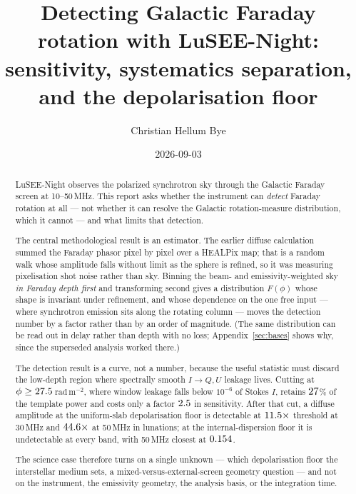 \documentclass[11pt]{article}
\title{Detecting Galactic Faraday rotation with LuSEE-Night:\\
  sensitivity, systematics separation, and the depolarisation floor}
\author{Christian Hellum Bye}
\date{2026-09-03}
\newcommand{\rmu}{\ensuremath{\mathrm{rad\,m^{-2}}}}
\begin{document}
\maketitle

\begin{abstract}
\noindent
LuSEE-Night observes the polarized synchrotron sky through the Galactic
Faraday screen at 10--50\,MHz. This report asks whether the instrument
can \emph{detect} Faraday rotation at all --- not whether it can
resolve the Galactic rotation-measure distribution, which it cannot ---
and what limits that detection.

The central methodological result is an estimator. The earlier diffuse
calculation summed the Faraday phasor pixel by pixel over a HEALPix
map; that is a random walk whose amplitude falls without limit as the
sphere is refined, so it was measuring pixelisation shot noise
rather than sky. Binning the beam- and emissivity-weighted sky
\emph{in Faraday depth first} and transforming second gives a
distribution $F(\phi)$ whose shape is invariant under refinement, and
whose dependence on the one free input --- where synchrotron emission
sits along the rotating column --- moves the detection number by a
factor \kscanAmpThirty{} rather than by an order of magnitude. (The same
distribution can be read out in delay rather than depth with no loss;
Appendix~\ref{sec:bases} shows why, since the superseded analysis
worked there.)

The detection result is a curve, not a number, because the useful
statistic must discard the low-depth region where spectrally smooth
$I\!\to\!Q,U$ leakage lives. Cutting at $\phi \ge 27.5$\,\rmu, where
window leakage falls below $10^{-6}$ of Stokes $I$, retains
$27$\% of the template power and costs only a factor
$2.5$ in sensitivity. After that cut, a diffuse amplitude at
the uniform-slab depolarisation floor is detectable at
$11.5\times$ threshold at 30\,MHz and
$44.6\times$ at 50\,MHz in \Lunations{} lunations; at the
internal-dispersion floor it is undetectable at every band, with
50\,MHz closest at $0.154$.

The science case therefore turns on a single unknown --- which
depolarisation floor the interstellar medium sets, a
mixed-versus-external-screen geometry question --- and not on the
instrument, the emissivity geometry, the analysis basis, or the
integration time.
\end{abstract}

\tableofcontents
\end{document}
